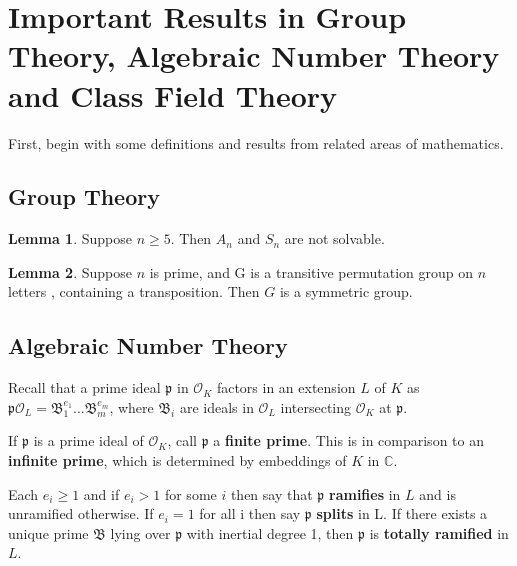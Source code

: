 \documentclass[12pt]{extarticle}
\newcommand{\<}{\langle}
\renewcommand{\>}{\rangle}
\theoremstyle{definition}
\newtheorem{lemma}{Lemma}
\begin{document}
\section{Important Results in Group Theory, Algebraic Number Theory and Class Field Theory}

First, begin with some definitions and results from related areas of mathematics.   

\subsection{Group Theory}
\begin{lemma}
Suppose $n \geq 5$. Then $A_n$ and $S_n$ are not solvable. 
\end{lemma}
\begin{lemma}
Suppose $n$ is prime, and G is a transitive permutation group on $n$ letters , containing a transposition. Then $G$ is a symmetric group.
\end{lemma}

\subsection{Algebraic Number Theory}
Recall that a prime ideal $\mathfrak{p}$ in $\mathcal{O}_K$ factors in an extension $L$ of $K$ as
$\mathfrak{p}\mathcal{O}_L=\mathfrak{B}_1^{e_1}...\mathfrak{B}_m^{e_m}$, where $\mathfrak{B}_i$ are ideals in $\mathcal{O}_L$ intersecting $\mathcal{O}_K$ at $\mathfrak{p}$. \par
If $\mathfrak{p}$ is a prime ideal of $\mathcal{O}_K$, call $\mathfrak{p}$ a \textbf{finite prime}. This is in comparison to an \textbf{infinite prime}, which is determined by embeddings of $K$ in $\mathbb{C}$. \par 
Each $e_i\geq1$ and if $e_i>1$ for some $i$ then say that $\mathfrak{p}$ \textbf{ramifies} in $L$ and is unramified otherwise. If $e_i=1$ for all i then say $\mathfrak{p}$ \textbf{splits} in L. If there exists a unique prime $\mathfrak{B}$ lying over $\mathfrak{p}$ with inertial degree 1, then $\mathfrak{p}$ is \textbf{totally ramified} in $L$. \par
\end{document}
